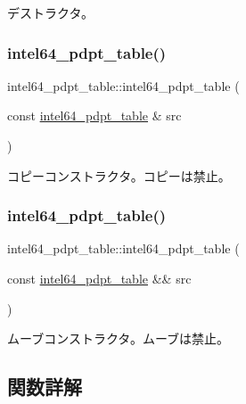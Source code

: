 デストラクタ。 \hypertarget{classintel64__pdpt__table_aa5679547ca3652a67ab58dad5280f7f4}{}\label{classintel64__pdpt__table_aa5679547ca3652a67ab58dad5280f7f4} 
\subsubsection{\texorpdfstring{intel64\+\_\+pdpt\+\_\+table()}{intel64\_pdpt\_table()}\hspace{0.1cm}{\footnotesize\ttfamily [2/3]}}
{\footnotesize\ttfamily intel64\+\_\+pdpt\+\_\+table\+::intel64\+\_\+pdpt\+\_\+table (\begin{DoxyParamCaption}\item[{const \hyperlink{classintel64__pdpt__table}{intel64\+\_\+pdpt\+\_\+table} \&}]{src }\end{DoxyParamCaption})\hspace{0.3cm}{\ttfamily [delete]}}

コピーコンストラクタ。コピーは禁止。 \hypertarget{classintel64__pdpt__table_adef3862481b45bfc4f9e1bf3e592655e}{}\label{classintel64__pdpt__table_adef3862481b45bfc4f9e1bf3e592655e} 
\subsubsection{\texorpdfstring{intel64\+\_\+pdpt\+\_\+table()}{intel64\_pdpt\_table()}\hspace{0.1cm}{\footnotesize\ttfamily [3/3]}}
{\footnotesize\ttfamily intel64\+\_\+pdpt\+\_\+table\+::intel64\+\_\+pdpt\+\_\+table (\begin{DoxyParamCaption}\item[{const \hyperlink{classintel64__pdpt__table}{intel64\+\_\+pdpt\+\_\+table} \&\&}]{src }\end{DoxyParamCaption})\hspace{0.3cm}{\ttfamily [delete]}}

ムーブコンストラクタ。ムーブは禁止。 

\subsection{関数詳解}
\hypertarget{classintel64__pdpt__table_a8faa68e17a871f951674ca7c7d42a60c}{}\label{classintel64__pdpt__table_a8faa68e17a871f951674ca7c7d42a60c} 
